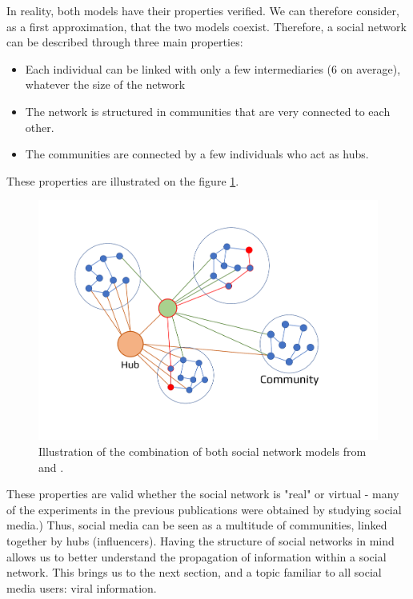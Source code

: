 In reality, both models have their properties verified.
We can therefore consider, as a first approximation, that the two models coexist.
Therefore, a social network can be described through three main properties:
\begin{itemize}
    \item Each individual can be linked with only a few intermediaries (6 on average), whatever the size of the network
    \item The network is structured in communities that are very connected to each other.
    \item The communities are connected by a few individuals who act as hubs.
\end{itemize}
These properties are illustrated on the figure \ref{context:social-network}.
\begin{figure}[h]
    \centering
    \includegraphics[width=\textwidth]{figures/network.pdf}
    \caption{Illustration of the combination of both social network models from \cite{wattsCollectiveDynamicsSmallworld1998} and \cite{barabasiEmergenceScalingRandom1999}.}
    \label{context:social-network}
\end{figure}

These properties are valid whether the social network is "real" or virtual - many of the experiments in the previous publications were obtained by studying social media.)
Thus, social media can be seen as a multitude of communities, linked together by hubs (influencers).
Having the structure of social networks in mind allows us to better understand the propagation of information within a social network.
This brings us to the next section, and a topic familiar to all social media users: viral information.

